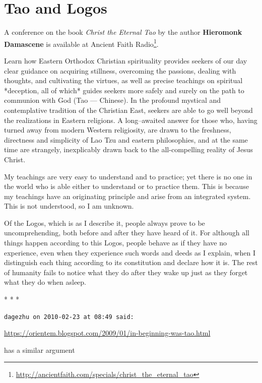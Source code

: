 \section{Tao and Logos}

A conference on the book \emph{Christ the Eternal Tao} by the author \textbf{Hieromonk Damascene} is available at Ancient Faith Radio\footnote{\url{http://ancientfaith.com/specials/christ\_the\_eternal\_tao}}.

\begin{quotex}
Learn how Eastern Orthodox Christian spirituality provides seekers of our day clear guidance on acquiring stillness, overcoming the passions, dealing with thoughts, and cultivating the virtues, as well as precise teachings on spiritual *deception, all of which* guides seekers more safely and surely on the path to communion with God (Tao --- Chinese). In the profound mystical and contemplative tradition of the Christian East, seekers are able to go well beyond the realizations in Eastern religions. A long--awaited answer for those who, having turned away from modern Western religiosity, are drawn to the freshness, directness and simplicity of Lao Tzu and eastern philosophies, and at the same time are strangely, inexplicably drawn back to the all-compelling reality of Jesus Christ.
\end{quotex}

\begin{quotex}
My teachings are very easy to understand and to practice; yet there is no one in the world who is able either to understand or to practice them. This is because my teachings have an originating principle and arise from an integrated system. This is not understood, so I am unknown.
\end{quotex}

\begin{quotex}
Of the Logos, which is as I describe it, people always prove to be uncomprehending, both before and after they have heard of it. For although all things happen according to this Logos, people behave as if they have no experience, even when they experience such words and deeds as I explain, when I distinguish each thing according to its constitution and declare how it is. The rest of humanity fails to notice what they do after they wake up just as they forget what they do when asleep.
\end{quotex}




\begin{center}* * *\end{center}

\begin{footnotesize}
\begin{sffamily}
\texttt{dagezhu on 2010-02-23 at 08:49 said:}

\url{https://orientem.blogspot.com/2009/01/in-beginning-was-tao.html}


has a similar argument


\hfill

\end{sffamily}
\end{footnotesize}

